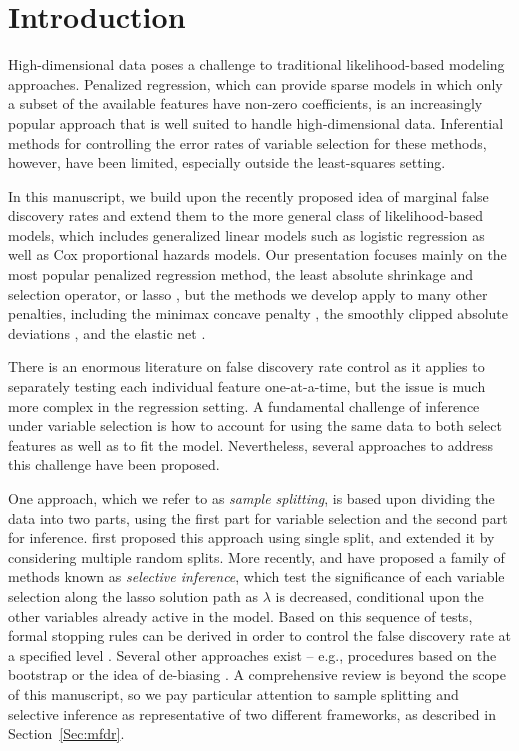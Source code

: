 \section{Introduction}

High-dimensional data poses a challenge to traditional likelihood-based modeling approaches.  Penalized regression, which can provide sparse models in which only a subset of the available features have non-zero coefficients, is an increasingly popular approach that is well suited to handle high-dimensional data.  Inferential methods for controlling the error rates of variable selection for these methods, however, have been limited, especially outside the least-squares setting.

In this manuscript, we build upon the recently proposed idea of marginal false discovery rates and extend them to the more general class of likelihood-based models, which includes generalized linear models such as logistic regression as well as Cox proportional hazards models.  Our presentation focuses mainly on the most popular penalized regression method, the least absolute shrinkage and selection operator, or lasso \citep{tibshirani_1996}, but the methods we develop apply to many other penalties, including the minimax concave penalty \citep[MCP; ][]{MCP}, the smoothly clipped absolute deviations \citep[SCAD; ][]{SCAD}, and the elastic net \citep{Elastic_Net}.

There is an enormous literature on false discovery rate control as it applies to separately testing each individual feature one-at-a-time, but the issue is much more complex in the regression setting.  A fundamental challenge of inference under variable selection is how to account for using the same data to both select features as well as to fit the model.  Nevertheless, several approaches to address this challenge have been proposed.

One approach, which we refer to as {\em sample splitting}, is based upon dividing the data into two parts, using the first part for variable selection and the second part for inference. \citet{Sample_Splitting} first proposed this approach using single split, and \citet{Meinshausen2009} extended it by considering multiple random splits.  More recently, \citet{CovTest} and \citet{Selective_Inference} have proposed a family of methods known as {\em selective inference}, which test the significance of each variable selection along the lasso solution path as $\lambda$ is decreased, conditional upon the other variables already active in the model. Based on this sequence of tests, formal stopping rules can be derived in order to control the false discovery rate at a specified level \citep{GSell2016}.  Several other approaches exist -- e.g., procedures based on the bootstrap \citep{Dezeure2017} or the idea of de-biasing \citep{Javanmard2014}.  A comprehensive review is beyond the scope of this manuscript, so we pay particular attention to sample splitting and selective inference as representative of two different frameworks, as described in Section~\ref{Sec:mfdr}.

